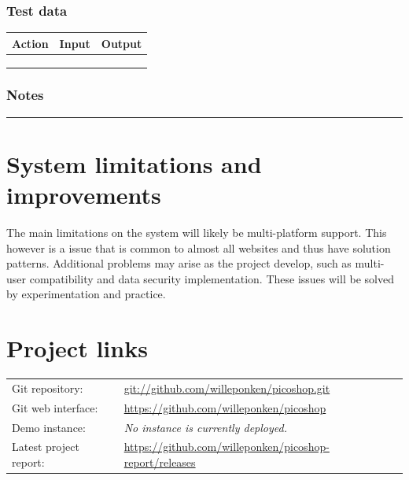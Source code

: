 \documentclass{article}
\newcommand{\ruler}{\noindent\rule{\textwidth}{1pt}}
\begin{document}
\subsubsection*{Test data}
\begin{table}[h]
\centering
\begin{tabular}{lll}
\hline
\multicolumn{1}{|l|}{\textbf{Action}} & \multicolumn{1}{l|}{\textbf{Input}} & \multicolumn{1}{l|}{\textbf{Output}} \\ \hline
& & \\
& & \\
& &                      
\end{tabular}
\end{table}
\subsubsection*{Notes}
\ruler

\newpage
\section{System limitations and improvements}
The main limitations on the system will likely be multi-platform support. This however is a issue that is common to almost all websites and thus have solution patterns. Additional problems may arise as the project develop, such as multi-user compatibility and data security implementation. These issues will be solved by experimentation and practice. 

\section{Project links}
\begin{table}[H]
\centering
\begin{tabular}{ll}
Git repository: & \url{git://github.com/willeponken/picoshop.git} \\
Git web interface: & \url{https://github.com/willeponken/picoshop} \\
Demo instance: & \textit{No instance is currently deployed.} \\
Latest project report: & \url{https://github.com/willeponken/picoshop-report/releases} \\
\end{tabular}
\end{table}
\end{document}
